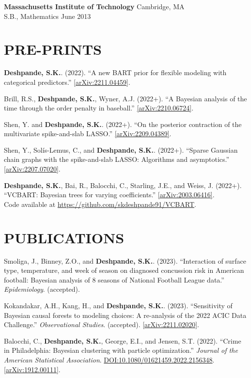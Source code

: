 \documentclass[margin]{res}
\def\skd{\textbf{Deshpande, S.K.}}
\begin{document}
\begin{resume}
                {\bf Massachusetts Institute of Technology} \hfill Cambridge, MA \\
                S.B., Mathematics \hfill June 2013 
  
  
\section{PRE-PRINTS}

\skd. (2022). ``A new BART prior for flexible modeling with categorical predictors.'' \href{https://arxiv.org/abs/2211.04459}{[arXiv:2211.04459]}.


Brill, R.S., \skd, Wyner, A.J. (2022+). ``A Bayesian analysis of the time through the order penalty in baseball.'' \href{https://arxiv.org/abs/2210.06724}{[arXiv:2210.06724]}.

Shen, Y. and \skd. (2022+). ``On the posterior contraction of the multivariate spike-and-slab LASSO.'' \href{https://arxiv.org/abs/2209.04389}{[arXiv:2209.04389]}.

Shen, Y., Sol\'{i}s-Lemus, C., and \skd. (2022+). ``Sparse Gaussian chain graphs with the spike-and-slab LASSO: Algorithms and asymptotics.'' \href{https://arxiv.org/abs/2207.07020}{[arXiv:2207.07020]}.

\skd, Bai, R., Balocchi, C., Starling, J.E., and Weiss, J. (2022+). ``VCBART: Bayesian trees for varying coefficients.'' \href{https://arxiv.org/abs/2003.06416}{[arXiv:2003.06416]}. \\ Code available at \url{https://github.com/skdeshpande91/VCBART}.


\section{PUBLICATIONS}

Smoliga, J., Binney, Z.O., and \skd. (2023). ``Interaction of surface type, temperature, and week of season on diagnosed concussion risk in American football: {Bayesian} analysis of 8 seasons of National Football League data.'' \textit{Epidemiology}. (accepted).


Kokandakar, A.H., Kang, H., and \skd. (2023). ``Sensitivity of Bayesian causal forests to modeling choices: A re-analysis of the 2022 ACIC Data Challenge.'' \textit{Observational Studies}. (accepted). \href{https://arxiv.org/abs/2211.02020}{[arXiv:2211.02020]}.

Balocchi, C., \skd, George, E.I., and Jensen, S.T. (2022). ``Crime in Philadelphia: Bayesian clustering with particle optimization.'' \textit{Journal of the American Statistical Association}. 
\href{https://doi.org/10.1080/01621459.2022.2156348}{DOI:10.1080/01621459.2022.2156348}. \href{https://arxiv.org/abs/1912.00111}{[arXiv:1912.00111]}. 


\end{resume}
\end{document}
